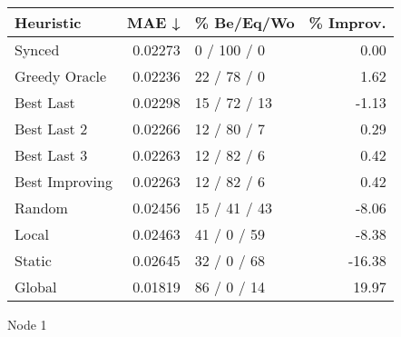 \begin{tabular}{lrlr}
\toprule
\textbf{Heuristic} & \textbf{MAE ↓} & \textbf{\% Be/Eq/Wo} & \textbf{\% Improv.} \\
\midrule
            Synced &        0.02273 &          0 / 100 / 0 &                0.00 \\
     Greedy Oracle &        0.02236 &          22 / 78 / 0 &                1.62 \\
         Best Last &        0.02298 &         15 / 72 / 13 &               -1.13 \\
       Best Last 2 &        0.02266 &          12 / 80 / 7 &                0.29 \\
       Best Last 3 &        0.02263 &          12 / 82 / 6 &                0.42 \\
    Best Improving &        0.02263 &          12 / 82 / 6 &                0.42 \\
            Random &        0.02456 &         15 / 41 / 43 &               -8.06 \\
             Local &        0.02463 &          41 / 0 / 59 &               -8.38 \\
            Static &        0.02645 &          32 / 0 / 68 &              -16.38 \\
            Global &        0.01819 &          86 / 0 / 14 &               19.97 \\
\bottomrule
\end{tabular}
\caption{Node 1}
\label{tab:iid_lr05_le1_bs2_1}

